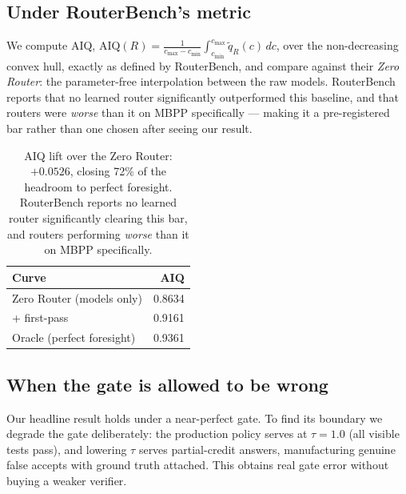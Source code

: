 \documentclass[11pt]{article}
\begin{document}
\subsection{Under RouterBench's metric}
\label{sec:results-aiq}

We compute AIQ, $\mathrm{AIQ}(R) = \frac{1}{c_{\max}-c_{\min}} \int_{c_{\min}}^{c_{\max}}
\tilde{q}_R(c)\, dc$, over the non-decreasing convex hull, exactly as defined by RouterBench, and
compare against their \emph{Zero Router}: the parameter-free interpolation between the raw models.
RouterBench reports that no learned router significantly outperformed this baseline, and that
routers were \emph{worse} than it on MBPP specifically --- making it a pre-registered bar rather
than one chosen after seeing our result.

\begin{table}[h]
\centering
\begin{tabular}{@{}lr@{}}
\toprule
\textbf{Curve} & \textbf{AIQ} \\
\midrule
Zero Router (models only)   & 0.8634 \\
{}+ first-pass              & 0.9161 \\
Oracle (perfect foresight)  & 0.9361 \\
\bottomrule
\end{tabular}
\caption{AIQ lift over the Zero Router: $+0.0526$, closing 72\% of the headroom to perfect
foresight. RouterBench reports no learned router significantly clearing this bar, and routers
performing \emph{worse} than it on MBPP specifically.}
\end{table}

\subsection{When the gate is allowed to be wrong}
\label{sec:results-sweep}

Our headline result holds under a near-perfect gate. To find its boundary we degrade the gate
deliberately: the production policy serves at $\tau = 1.0$ (all visible tests pass), and lowering
$\tau$ serves partial-credit answers, manufacturing genuine false accepts with ground truth
attached. This obtains real gate error without buying a weaker verifier.
\end{document}
